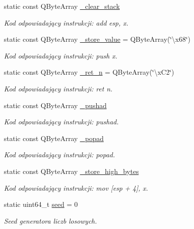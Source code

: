 \begin{DoxyCompactItemize}
static const Q\-Byte\-Array \hyperlink{class_code_defines_a85aef38055b98600a9d3d0ca776dcd06}{\-\_\-clear\-\_\-stack}
\begin{DoxyCompactList}\small\item\em Kod odpowiadający instrukcji\-: add esp, x. \end{DoxyCompactList}\item 
static const Q\-Byte\-Array \hyperlink{class_code_defines_accd429ecdb9272f239e6c3057dfc46c6}{\-\_\-store\-\_\-value} = Q\-Byte\-Array(\char`\"{}\textbackslash{}x68\char`\"{})
\begin{DoxyCompactList}\small\item\em Kod odpowiadający instrukcji\-: push x. \end{DoxyCompactList}\item 
static const Q\-Byte\-Array \hyperlink{class_code_defines_aa3be27e8f78dec6d99094b54a3363ba4}{\-\_\-ret\-\_\-n} = Q\-Byte\-Array(\char`\"{}\textbackslash{}x\-C2\char`\"{})
\begin{DoxyCompactList}\small\item\em Kod odpowiadający instrukcji\-: ret n. \end{DoxyCompactList}\item 
static const Q\-Byte\-Array \hyperlink{class_code_defines_a619c40323fbd1917a50692407d8c86d4}{\-\_\-pushad}
\begin{DoxyCompactList}\small\item\em Kod odpowiadający instrukcji\-: pushad. \end{DoxyCompactList}\item 
static const Q\-Byte\-Array \hyperlink{class_code_defines_a1fe4292fe5f270ca2986744ac768cab4}{\-\_\-popad}
\begin{DoxyCompactList}\small\item\em Kod odpowiadający instrukcji\-: popad. \end{DoxyCompactList}\item 
static const Q\-Byte\-Array \hyperlink{class_code_defines_ad8225e99b66893881d578968d457f9dd}{\-\_\-store\-\_\-high\-\_\-bytes}
\begin{DoxyCompactList}\small\item\em Kod odpowiadający instrukcji\-: mov \mbox{[}esp + 4\mbox{]}, x. \end{DoxyCompactList}\item 
static uint64\-\_\-t \hyperlink{class_code_defines_a962393fc932700039b48a9a35b0bd4d2}{seed} = 0
\begin{DoxyCompactList}\small\item\em Seed generatora liczb losowych. \end{DoxyCompactList}\end{DoxyCompactItemize}


